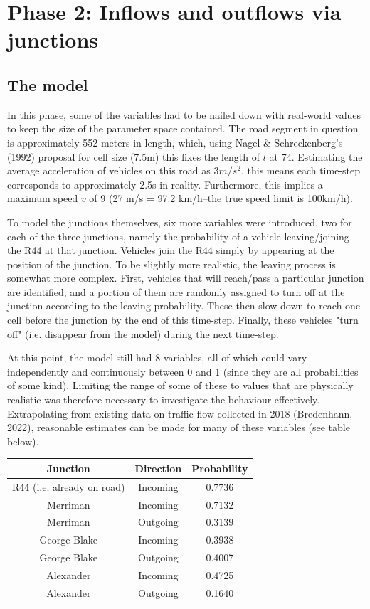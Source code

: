 \documentclass{article}
\begin{document}
\section*{Phase 2: Inflows and outflows via junctions}

\subsection*{The model}

In this phase, some of the variables had to be nailed down with real-world values to keep the size of the parameter space contained. The road segment in question is approximately 552 meters in length, which, using Nagel \& Schreckenberg's (1992) proposal for cell size (7.5m) this fixes the length of $l$ at 74. Estimating the average acceleration of vehicles on this road as $3m/s^{2}$, this means each time-step corresponds to approximately 2.5s in reality. Furthermore, this implies a maximum speed $v$ of 9 (27 m/s = 97.2 km/h--the true speed limit is 100km/h).

To model the junctions themselves, six more variables were introduced, two for each of the three junctions, namely the probability of a vehicle leaving/joining the R44 at that junction. Vehicles join the R44 simply by appearing at the position of the junction. To be slightly more realistic, the leaving process is somewhat more complex. First, vehicles that will reach/pass a particular junction are identified, and a portion of them are randomly assigned to turn off at the junction according to the leaving probability. These then slow down to reach one cell before the junction by the end of this time-step. Finally, these vehicles "turn off" (i.e. disappear from the model) during the next time-step.

At this point, the model still had 8 variables, all of which could vary independently and continuously between 0 and 1 (since they are all probabilities of some kind). Limiting the range of some of these to values that are physically realistic was therefore necessary to investigate the behaviour effectively. Extrapolating from existing data on traffic flow collected in 2018 (Bredenhann, 2022), reasonable estimates can be made for many of these variables (see table below).

\begin{center}
\begin{tabular}{ |c|c|c| }
 \hline
 Junction & Direction & Probability \\
 \hline
 R44 (i.e. already on road) & Incoming & 0.7736\\
 Merriman & Incoming & 0.7132 \\
 Merriman & Outgoing & 0.3139 \\
 George Blake & Incoming & 0.3938 \\
 George Blake & Outgoing & 0.4007 \\
 Alexander & Incoming & 0.4725 \\
 Alexander & Outgoing & 0.1640 \\
 \hline
\end{tabular}
\end{center}
\end{document}
